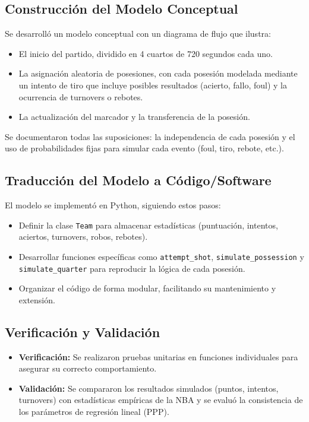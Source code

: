 \documentclass[12pt]{article}
\begin{document}
\subsection{Construcción del Modelo Conceptual}
Se desarrolló un modelo conceptual con un diagrama de flujo que ilustra:
\begin{itemize}
    \item El inicio del partido, dividido en 4 cuartos de 720 segundos cada uno.
    \item La asignación aleatoria de posesiones, con cada posesión modelada mediante un intento de tiro que incluye posibles resultados (acierto, fallo, foul) y la ocurrencia de turnovers o rebotes.
    \item La actualización del marcador y la transferencia de la posesión.
\end{itemize}
Se documentaron todas las suposiciones: la independencia de cada posesión y el uso de probabilidades fijas para simular cada evento (foul, tiro, rebote, etc.).

\subsection{Traducción del Modelo a Código/Software}
El modelo se implementó en Python, siguiendo estos pasos:
\begin{itemize}
    \item Definir la clase \texttt{Team} para almacenar estadísticas (puntuación, intentos, aciertos, turnovers, robos, rebotes).
    \item Desarrollar funciones específicas como \texttt{attempt\_shot}, \texttt{simulate\_possession} y \texttt{simulate\_quarter} para reproducir la lógica de cada posesión.
    \item Organizar el código de forma modular, facilitando su mantenimiento y extensión.
\end{itemize}

\subsection{Verificación y Validación}
\begin{itemize}
    \item \textbf{Verificación:} Se realizaron pruebas unitarias en funciones individuales para asegurar su correcto comportamiento.
    \item \textbf{Validación:} Se compararon los resultados simulados (puntos, intentos, turnovers) con estadísticas empíricas de la NBA y se evaluó la consistencia de los parámetros de regresión lineal (PPP).
\end{itemize}
\end{document}
